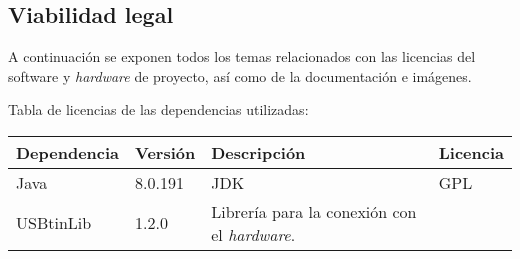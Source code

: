 \subsection{Viabilidad legal}

A continuación se exponen todos los temas relacionados con las licencias del software y \emph{hardware} de proyecto, así como de la documentación e imágenes.

Tabla de licencias de las dependencias utilizadas:

\begin{longtable}[]{@{}llll@{}}
\toprule
\begin{minipage}[b]{0.18\columnwidth}\raggedright\strut
Dependencia\strut
\end{minipage} & \begin{minipage}[b]{0.10\columnwidth}\raggedright\strut
Versión\strut
\end{minipage} & \begin{minipage}[b]{0.49\columnwidth}\raggedright\strut
Descripción\strut
\end{minipage} & \begin{minipage}[b]{0.11\columnwidth}\raggedright\strut
Licencia\strut
\end{minipage}\tabularnewline
\midrule
\endhead
\begin{minipage}[t]{0.18\columnwidth}\raggedright\strut
Java\strut
\end{minipage} & \begin{minipage}[t]{0.08\columnwidth}\raggedright\strut
8.0.191\strut
\end{minipage} & \begin{minipage}[t]{0.49\columnwidth}\raggedright\strut
JDK\strut
\end{minipage} & \begin{minipage}[t]{0.11\columnwidth}\raggedright\strut
GPL\strut
\end{minipage}\tabularnewline
\begin{minipage}[t]{0.18\columnwidth}\raggedright\strut
USBtinLib\strut
\end{minipage} & \begin{minipage}[t]{0.08\columnwidth}\raggedright\strut
1.2.0\strut
\end{minipage} & \begin{minipage}[t]{0.49\columnwidth}\raggedright\strut
Librería para la conexión con el \emph{hardware}.\strut
\end{minipage} & \begin{minipage}[t]{0.11\columnwidth}\raggedright\strut

\end{minipage}
\end{longtable}
